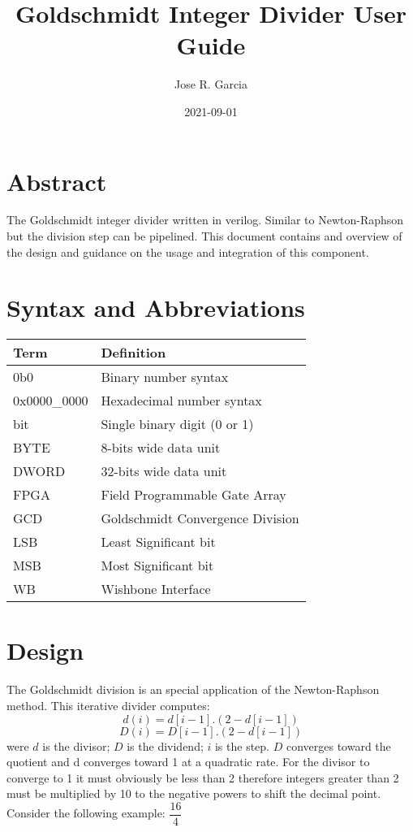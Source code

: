 \documentclass[letterpaper]{article}
\title{Goldschmidt Integer Divider User Guide}
\date{2021-09-01}
\author{Jose R. Garcia}
\begin{document}
	\maketitle
	\newpage
	
	\tableofcontents
    \newpage
    
	\section{Abstract}
	
	The Goldschmidt integer divider written in verilog. Similar to Newton-Raphson but the division step can be pipelined. This document contains and overview of the design and guidance on the usage and integration of this component.
	
	\section{Syntax and Abbreviations}
	
	\begin{tabular}{l|l}
		Term & Definition \\
		\hline
		0b0 & Binary number syntax \\
		\hline
		0x0000\_0000 & Hexadecimal number syntax \\
		\hline
		bit & Single binary digit (0 or 1) \\
		\hline
		BYTE & 8-bits wide data unit \\
		\hline
		DWORD & 32-bits wide data unit \\
		\hline
		FPGA & Field Programmable Gate Array \\
		\hline
		GCD & Goldschmidt Convergence Division \\
		\hline
		LSB & Least Significant bit \\
		\hline
		MSB & Most Significant bit \\
		\hline
		WB & Wishbone Interface \\
	\end{tabular}
	
	\section{Design}
	\paragraph{}
	The Goldschmidt division is an special application of the Newton-Raphson method. This iterative divider computes:
	\begin{equation*}
	d(i) = d[i-1].(2-d[i-1])
	\end{equation*}
	\begin{equation*}
	D(i) = D[i-1].(2-d[i-1])
	\end{equation*}
	were \( d \) is the divisor; \( D \) is the dividend; \( i \) is the step. \( D \) converges toward the quotient and d converges toward 1 at a quadratic rate. For the divisor to converge to 1 it must obviously be less than 2 therefore integers greater than 2 must be multiplied by 10 to the negative powers to shift the decimal point. Consider the following example: $ \dfrac{16}{4} $
	
\end{document}
